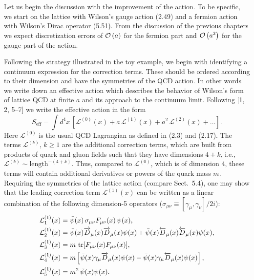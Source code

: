 Let us begin the discussion with the improvement of the action. To be
specific, we start on the lattice with Wilson's gauge action (2.49) and a
fermion action with Wilson's Dirac operator (5.51). From the discussion of the
previous chapters we expect discretization errors of $\mathcal{O}\left(a\right)$ for the
fermion part and $\mathcal{O}\left(a^2\right)$ for the gauge part of the action.

Following the strategy illustrated in the toy example, we begin with
identifying a continuum expression for the correction terms. These should be
ordered according to their dimension and have the symmetries of the QCD
action. In other words we write down an effective action which describes the
behavior of Wilson's form of lattice QCD at finite $a$ and its approach to the
continuum limit. Following [1, 2, 5--7] we write the effective action in the
form
\begin{equation}
  S_{\mathrm{eff}} = \int d^4x\,
    \left[\mathcal{L}^{(0)}(x) + a\,\mathcal{L}^{(1)}(x)
    + a^2\,\mathcal{L}^{(2)}(x) + \ldots\right] .
\end{equation}
Here $\mathcal{L}^{(0)}$ is the usual QCD Lagrangian as defined in (2.3) and
(2.17). The terms $\mathcal{L}^{(k)}$, $k \geq 1$ are the additional
correction terms, which are built from products of quark and gluon fields such
that they have dimensions $4+k$, i.e., $\mathcal{L}^{(k)} \sim
\mathrm{length}^{-(4+k)}$. Thus, compared to $\mathcal{L}^{(0)}$, which is of
dimension 4, these terms will contain additional derivatives or powers of the
quark mass $m$. Requiring the symmetries of the lattice action (compare
Sect.~5.4), one may show that the leading correction term
$\mathcal{L}^{(1)}(x)$ can be written as a linear combination of the following
dimension-5 operators ($\sigma_{\mu\nu} \equiv [\gamma_\mu,\gamma_\nu]/2i$):
\begin{align}
  \mathcal{L}^{(1)}_1(x)
  &= \bar\psi(x)\,\sigma_{\mu\nu}F_{\mu\nu}(x)\,\psi(x) , \nonumber\\
  \mathcal{L}^{(1)}_2(x)
  &= \bar\psi(x)\overrightarrow{D}_\mu(x)\overrightarrow{D}_\mu(x)\psi(x)
   + \bar\psi(x)\overleftarrow{D}_\mu(x)\overleftarrow{D}_\mu(x)\psi(x) , \nonumber\\
  \mathcal{L}^{(1)}_3(x)
  &= m\,\operatorname{tr}[F_{\mu\nu}(x)F_{\mu\nu}(x)] , \nonumber\\
  \mathcal{L}^{(1)}_4(x)
  &= m\left[\bar\psi(x)\gamma_\mu\overrightarrow{D}_\mu(x)\psi(x)
   - \bar\psi(x)\gamma_\mu\overleftarrow{D}_\mu(x)\psi(x)\right] , \nonumber\\
  \mathcal{L}^{(1)}_5(x)
  &= m^2\,\bar\psi(x)\psi(x) .
\end{align}
